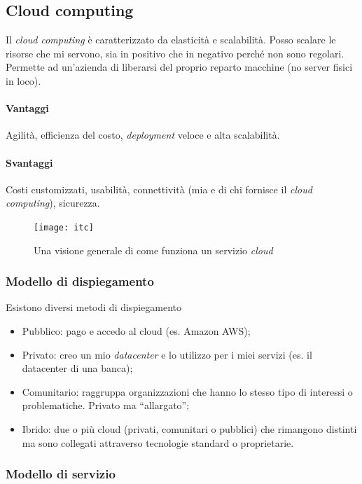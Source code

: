 \subsection{Cloud computing}

Il \textit{cloud computing} è caratterizzato da elasticità e scalabilità. Posso
scalare le risorse che mi servono, sia in positivo che in negativo perché non
sono regolari. Permette ad un'azienda di liberarsi del proprio reparto macchine
(no server fisici in loco).

\paragraph*{Vantaggi} Agilità, efficienza del costo, \textit{deployment} veloce
e alta scalabilità.

\paragraph*{Svantaggi} Costi customizzati, usabilità, connettività (mia e di
chi fornisce il \textit{cloud computing}), sicurezza.


\begin{figure}[H]
 \centering
 \texttt{[image: itc]}
 \caption{Una visione generale di come funziona un servizio \textit{cloud}}
\end{figure}

\subsubsection{Modello di dispiegamento}

Esistono diversi metodi di dispiegamento
\begin{itemize}
  \item Pubblico: pago e accedo al cloud (es. Amazon AWS);
  \item Privato: creo un mio \textit{datacenter} e lo utilizzo per i miei
  servizi (es. il datacenter di una banca);
  \item Comunitario: raggruppa organizzazioni che hanno lo stesso tipo di
  interessi o problematiche. Privato ma ``allargato'';
  \item Ibrido: due o più cloud (privati, comunitari o pubblici) che rimangono
  distinti ma sono collegati attraverso tecnologie standard o proprietarie.
\end{itemize}


\subsubsection{Modello di servizio}


